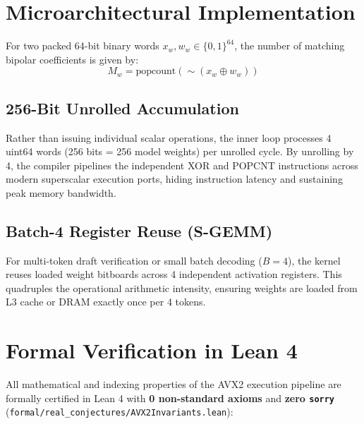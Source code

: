 \documentclass[10pt,twocolumn,letterpaper]{article}
\begin{document}
\section{Microarchitectural Implementation}

For two packed 64-bit binary words $x_w, w_w \in \{0, 1\}^{64}$, the number of matching bipolar coefficients is given by:
\begin{equation}
M_w = \text{popcount}(\sim (x_w \oplus w_w))
\end{equation}

\subsection{256-Bit Unrolled Accumulation}
Rather than issuing individual scalar operations, the inner loop processes 4 uint64 words (256 bits = 256 model weights) per unrolled cycle. By unrolling by 4, the compiler pipelines the independent XOR and POPCNT instructions across modern superscalar execution ports, hiding instruction latency and sustaining peak memory bandwidth.

\subsection{Batch-4 Register Reuse (S-GEMM)}
For multi-token draft verification or small batch decoding ($B = 4$), the kernel reuses loaded weight bitboards across 4 independent activation registers. This quadruples the operational arithmetic intensity, ensuring weights are loaded from L3 cache or DRAM exactly once per 4 tokens.

\section{Formal Verification in Lean 4}

All mathematical and indexing properties of the AVX2 execution pipeline are formally certified in Lean 4 with \textbf{0 non-standard axioms} and \textbf{zero \texttt{sorry}} (\texttt{formal/real\_conjectures/AVX2Invariants.lean}):
\end{document}
